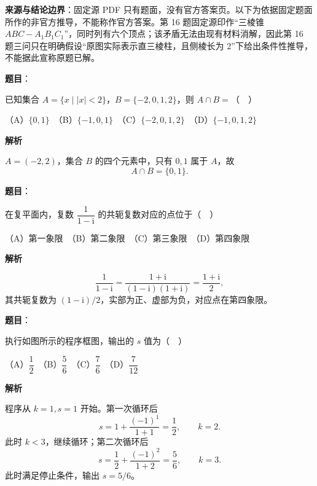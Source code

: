 
\begin{gktip}
\textbf{来源与结论边界}：固定源 PDF 只有题面，没有官方答案页。以下为依据固定题面所作的非官方推导，不能称作官方答案。第 16 题固定源印作“三棱锥 $ABC-A_1B_1C_1$”，同时列有六个顶点；该矛盾无法由现有材料消解，因此第 16 题三问只在明确假设“原图实际表示直三棱柱，且侧棱长为 $2$”下给出条件性推导，不能据此宣称原题已解。
\end{gktip}


\begin{answer}

\textbf{题目}：

已知集合 $A=\{x\mid |x|<2\}$，$B=\{-2,0,1,2\}$，则 $A\cap B=$（　）

（A）$\{0,1\}$　（B）$\{-1,0,1\}$　（C）$\{-2,0,1,2\}$　（D）$\{-1,0,1,2\}$

\textbf{解析}

$A=(-2,2)$，集合 $B$ 的四个元素中，只有 $0,1$ 属于 $A$，故
\nopagebreak[4]
\[
A\cap B=\{0,1\}.
\]


\end{answer}
\begin{answer}

\textbf{题目}：

在复平面内，复数 $\dfrac{1}{1-\mathrm i}$ 的共轭复数对应的点位于（　）

（A）第一象限　（B）第二象限　（C）第三象限　（D）第四象限

\textbf{解析}

\nopagebreak[4]
\[
\frac1{1-\mathrm i}=\frac{1+\mathrm i}{(1-\mathrm i)(1+\mathrm i)}=\frac{1+\mathrm i}{2},
\]
其共轭复数为 $(1-\mathrm i)/2$，实部为正、虚部为负，对应点在第四象限。


\end{answer}
\begin{answer}

\textbf{题目}：

执行如图所示的程序框图，输出的 $s$ 值为（　）
\nopagebreak[4]
\begin{center}\end{center}
\nopagebreak[4]
（A）$\dfrac12$　（B）$\dfrac56$　（C）$\dfrac76$　（D）$\dfrac7{12}$

\textbf{解析}

程序从 $k=1,s=1$ 开始。第一次循环后
\nopagebreak[4]
\[
s=1+\frac{(-1)^1}{1+1}=\frac12,\qquad k=2.
\]
此时 $k<3$，继续循环；第二次循环后
\nopagebreak[4]
\[
s=\frac12+\frac{(-1)^2}{1+2}=\frac56,\qquad k=3.
\]
此时满足停止条件，输出 $s=5/6$。


\end{answer}
